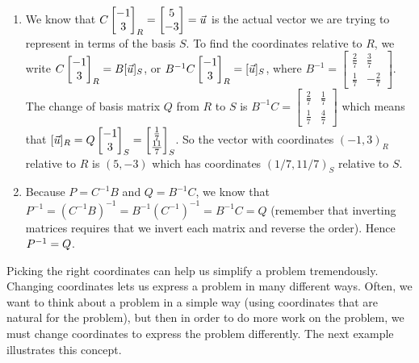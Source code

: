 \begin{example}
\begin{enumerate}
\item
We know that $C \begin{bmatrix} -1\\3 \end{bmatrix}_{R} = \begin{bmatrix} 5\\-3 \end{bmatrix} =\vec u$ is the actual vector we are trying to represent in terms of the basis $S$. To find the coordinates relative to $R$, we write $C \begin{bmatrix} -1\\3 \end{bmatrix}_{R} = B[\vec u]_{S}$, or $B^{-1}C  \begin{bmatrix} -1\\3 \end{bmatrix}_{R}= [\vec u]_{S}$, where 
$B^{-1} = 
\begin{bmatrix}
 \frac{2}{7} & \frac{3}{7} \\
 \frac{1}{7} & -\frac{2}{7}
\end{bmatrix}
$. 
The change of basis matrix $Q$ from $R$ to $S$  is 
$B^{-1}C =  
\begin{bmatrix}
 \frac{2}{7} & \frac{1}{7} \\
 \frac{1}{7} & \frac{4}{7}
\end{bmatrix}
$ which means that $[\vec u]_{R}= Q\begin{bmatrix} -1\\3 \end{bmatrix}_S = \begin{bmatrix} \frac{1}{7}\\\frac{11}{7} \end{bmatrix}_{S}$.
So the vector with coordinates $(-1,3)_{R}$ relative to $R$ is $(5,-3)$ which has coordinates $(1/7,11/7)_{S}$ relative to $S$. 
\item Because $P=C^{-1}B$ and $Q=B^{-1}C$, we know that $P^{-1} = (C^{-1}B)^{-1} = B^{-1}(C^{-1})^{-1} = B^{-1}C=Q$ (remember that inverting matrices requires that we invert each matrix and reverse the order). Hence $P^{-1} = Q$.

\end{enumerate}
\end{example}

Picking the right coordinates can help us simplify a problem tremendously.  Changing coordinates lets us express a problem in many different ways.  Often, we want to think about a problem in a simple way (using coordinates that are natural for the problem), but then in order to do more work on the problem, we must change coordinates to express the problem differently.  The next example illustrates this concept.



